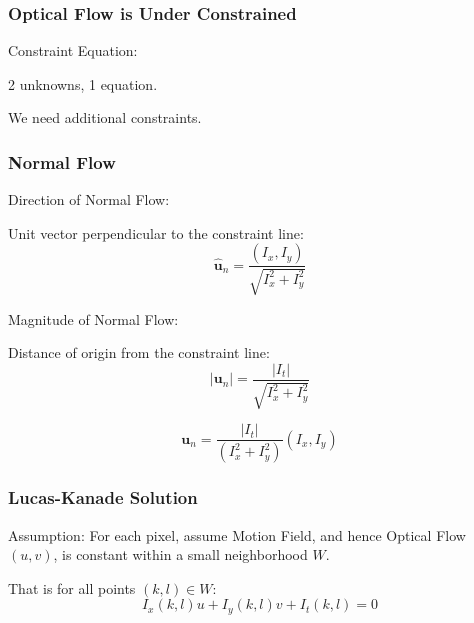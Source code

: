 \begin{frame}
  \frametitle{Optical Flow is Under Constrained}

  Constraint Equation: \quad {}

  \vspace{0.5cm}
  2 unknowns, 1 equation.

  \vspace{1cm}
  We need additional constraints.

\end{frame}


\begin{frame}
  \frametitle{Normal Flow}

  Direction of Normal Flow:

  Unit vector perpendicular to the constraint line:
  \[
  \hat{\mathbf{u}}_n = \frac{(I_x, I_y)}{\sqrt{I_x^2 + I_y^2}}
  \]

  Magnitude of Normal Flow:

  Distance of origin from the constraint line:
  \[
  |\mathbf{u}_n| = \frac{|I_t|}{\sqrt{I_x^2 + I_y^2}}
  \]

  \[
  \boxed{\mathbf{u}_n = \frac{|I_t|}{(I_x^2 + I_y^2)} (I_x, I_y)}
  \]


\end{frame}



\begin{frame}
  \frametitle{Lucas-Kanade Solution}

  Assumption: For each pixel, assume Motion Field, and hence Optical Flow $(u,v)$, is constant within a small neighborhood $W$.


  That is for all points $(k,l) \in W$:
  \[
  I_x(k,l)u + I_y(k,l)v + I_t(k,l) = 0
  \]

\end{frame}


